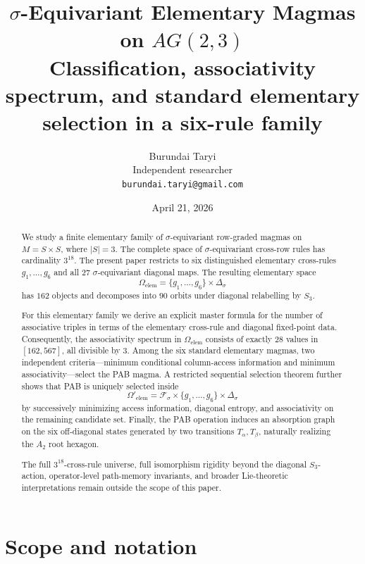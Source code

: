 \documentclass[11pt]{article}
\title{$\sigma$-Equivariant Elementary Magmas on $AG(2,3)$\\
\large Classification, associativity spectrum, and standard elementary selection in a six-rule family}
\author{
Burundai Taryi\\
Independent researcher\\
\texttt{burundai.taryi@gmail.com}
}
\date{April 21, 2026}
\begin{document}
\maketitle

\begin{abstract}

We study a finite elementary family of \(\sigma\)-equivariant row-graded magmas on
\(M=S\times S\), where \(|S|=3\). The complete space of \(\sigma\)-equivariant
cross-row rules has cardinality \(3^{18}\). The present paper restricts to six
distinguished elementary cross-rules \(g_1,\ldots,g_6\) and all \(27\)
\(\sigma\)-equivariant diagonal maps. The resulting elementary space
\[
\Omega_{\mathrm{elem}}=\{g_1,\ldots,g_6\}\times\Delta_\sigma
\]
has \(162\) objects and decomposes into \(90\) orbits under diagonal relabelling
by \(S_3\).

For this elementary family we derive an explicit master formula for the number
of associative triples in terms of the elementary cross-rule and diagonal
fixed-point data. Consequently, the associativity spectrum in
\(\Omega_{\mathrm{elem}}\) consists of exactly \(28\) values in \([162,567]\), all
divisible by \(3\). Among the six standard elementary magmas, two
independent criteria---minimum conditional column-access information and minimum
associativity---select the PAB magma. A restricted sequential selection theorem
further shows that PAB is uniquely selected inside
\[
\Omega'_{\mathrm{elem}}=\mathcal F_\sigma\times\{g_1,\ldots,g_6\}\times\Delta_\sigma
\]
by successively minimizing access information, diagonal entropy, and
associativity on the remaining candidate set. Finally, the PAB operation induces an
absorption graph on the six off-diagonal states generated by two transitions
\(T_\alpha,T_\beta\), naturally realizing the \(A_2\) root hexagon.

The full \(3^{18}\)-cross-rule universe, full isomorphism rigidity beyond the
diagonal \(S_3\)-action, operator-level path-memory invariants, and broader
Lie-theoretic interpretations remain outside the scope of this paper.

\end{abstract}


\section*{Scope and notation}
\end{document}
